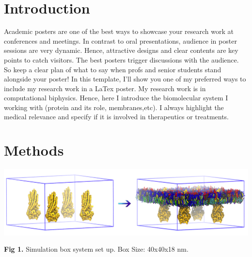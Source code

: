 \documentclass[a0,final,landscape]{a0poster}
\begin{document}
\vspace{20cm}
\begin{minipage}[c][30cm][c]{0.32\textwidth}
\section*{\textcolor{blue1}{\Huge \bf{Introduction}}}
\vspace{-1cm}
\large
Academic posters are one of the best ways to showcase your research work at conferences and meetings. In contrast to oral presentations, audience in poster sessions are very dynamic. Hence, attractive designs and clear contents are key points to catch visitors. The best posters trigger discussions with the audience. So keep a clear plan of what to say when profs and senior students stand alongside your poster! In this template, I'll show you one of my preferred ways to include my research work in a LaTex poster. My research work is in computational biphysics. Hence, here I introduce the biomolecular system I working with (protein and its role, membranes,etc). I always highlight the medical relevance and specify if it is involved in therapeutics or treatments.\\


\vspace{-1cm}
\section*{\textcolor{blue1}{\Huge \bf{Methods}}}
\vspace{-0.8cm}
\includegraphics[scale=0.47]{img/system1.png} \\
\vspace{-1cm}
\begin{center}
\small{\textbf{Fig 1.} Simulation box system set up. Box Size: 40x40x18 nm.\\}
\end{center}


\end{minipage}
\end{document}
